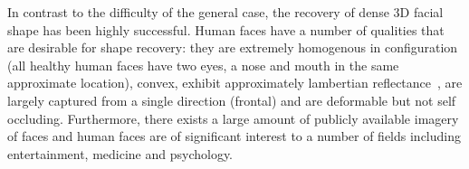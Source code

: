 In contrast to the difficulty of the general case, the recovery of dense 3D
facial shape has been highly successful. Human faces have a number of qualities
that are desirable for shape recovery: they are extremely homogenous in
configuration (all healthy human faces have two eyes, a nose and mouth in the
same approximate location), convex, exhibit approximately lambertian 
reflectance~\cite{Sirovich:1987te,RefWorks:314,Basri:2003ie,RefWorks:98,Hallinan:1994dz},
are largely captured from a single direction (frontal) and are deformable
but not self occluding. Furthermore, there exists a large amount of publicly
available imagery of faces and human faces are of significant interest to a 
number of fields including entertainment, medicine and psychology.
\begin{table}[t]
	\centering
\end{table}
